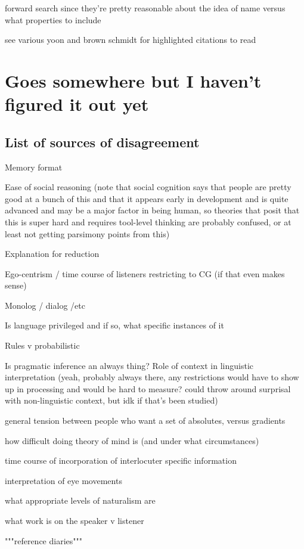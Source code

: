 \documentclass[]{article}
\begin{document}
forward search \cite{heller2012} since they're pretty reasonable about the idea of name versus what properties to include 


see various yoon and brown schmidt for highlighted citations to read 

\section{Goes somewhere but I haven't figured it out yet}

\subsection{List of sources of disagreement}

Memory format 

Ease of social reasoning (note that social cognition says that people are pretty good at a bunch of this and that it appears early in development and is quite advanced and may be a major factor in being human, so theories that posit that this is super hard and requires tool-level thinking are probably confused, or at least not getting parsimony points from this)

Explanation for reduction

Ego-centrism / time course of listeners restricting to CG (if that even makes sense)

Monolog / dialog /etc 

Is language privileged and if so, what specific instances of it

Rules v probabilistic

Is pragmatic inference an always thing? Role of context in linguistic interpretation (yeah, probably always there, any restrictions would have to show up in processing and would be hard to measure? could throw around surprisal with non-linguistic context, but idk if that's been studied) 

general tension between people who want a set of absolutes, versus gradients

how difficult doing theory of mind is (and under what circumstances)

time course of incorporation of interlocuter specific information 

interpretation of eye movements

what appropriate levels of naturalism are

what work is on the speaker v listener

"""reference diaries"""
\end{document}
